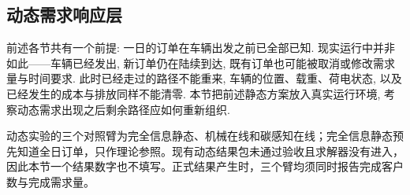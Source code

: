 \documentclass{setp-new}
\begin{document}
\subsection{动态需求响应层}

前述各节共有一个前提: 一日的订单在车辆出发之前已全部已知.
现实运行中并非如此——车辆已经发出, 新订单仍在陆续到达,
既有订单也可能被取消或修改需求量与时间要求.
此时已经走过的路径不能重来, 车辆的位置、载重、荷电状态,
以及已经发生的成本与排放同样不能清零.
本节把前述静态方案放入真实运行环境, 考察动态需求出现之后剩余路径应如何重新组织.

动态实验的三个对照臂为完全信息静态、机械在线和碳感知在线；完全信息静态预先知道全日订单，只作理论参照。现有动态结果包未通过验收且求解器没有进入，因此本节一个结果数字也不填写。正式结果产生时，三个臂均须同时报告完成客户数与完成需求量。
\end{document}
